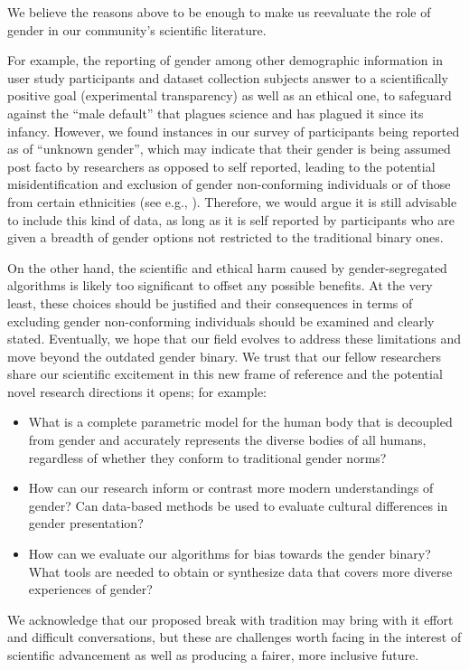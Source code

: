 \documentclass[nonacm,sigconf,review,balance=false]{acmart}
\begin{document}
We believe the reasons above to be enough to make us reevaluate the role of
gender in our community's scientific literature.

For example, the reporting of gender among other demographic information in user
study participants and dataset collection subjects answer to a scientifically
positive goal (experimental transparency) as well as an ethical one, to
safeguard against the “male default” that plagues science and has plagued it
since its infancy. However, we found instances in our survey of participants
being reported as of “unknown gender”, which may indicate that their gender is
being assumed post facto by researchers as opposed to self reported, leading to
the potential misidentification and exclusion of gender non-conforming
individuals or of those from certain ethnicities (see e.g.,
\cite{santamaria2018comparison,buolamwini2018gender}). Therefore, we would argue
it is still advisable to include this kind of data, as long as it is self
reported by participants who are given a breadth of gender options not
restricted to the traditional binary ones.

On the other hand, the scientific and ethical harm caused by gender-segregated
algorithms is likely too significant to offset any possible benefits. At the
very least, these choices should be justified and their consequences in terms of
excluding gender non-conforming individuals should be examined and clearly
stated. Eventually, we hope that our field evolves to address these limitations
and move beyond the outdated gender binary. We trust that our fellow researchers
share our scientific excitement in this new frame of reference and the potential
novel research directions it opens; for example:
\begin{itemize}
    \item What is a complete parametric model for the human body that is
    decoupled from gender and accurately represents the diverse bodies of all
    humans, regardless of whether they conform to traditional gender norms?
    \item How can our research inform or contrast more modern understandings of
    gender? Can data-based methods be used to evaluate cultural differences in
    gender presentation?
    \item How can we evaluate our algorithms for bias towards the gender binary?
    What tools are needed to obtain or synthesize data that covers more diverse
    experiences of gender?
\end{itemize}

We acknowledge that our proposed break with tradition may bring with it effort
and difficult conversations, but these are challenges worth facing in the
interest of scientific advancement as well as producing a fairer, more inclusive
future.



\end{document}
